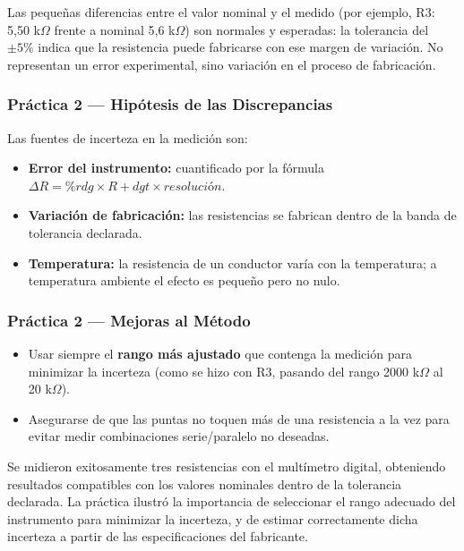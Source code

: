 Las pequeñas diferencias entre el valor nominal y el medido (por ejemplo, R3: 5{,}50 k$\Omega$ frente a nominal 5{,}6 k$\Omega$) son normales y esperadas: la tolerancia del $\pm 5\%$ indica que la resistencia puede fabricarse con ese margen de variación.
No representan un error experimental, sino variación en el proceso de fabricación.

\subsubsection{Práctica 2 --- Hipótesis de las Discrepancias}

Las fuentes de incerteza en la medición son:
\begin{itemize}
    \item \textbf{Error del instrumento:} cuantificado por la fórmula $\Delta R = \%rdg \times R + dgt \times resolución$.
    \item \textbf{Variación de fabricación:} las resistencias se fabrican dentro de la banda de tolerancia declarada.
    \item \textbf{Temperatura:} la resistencia de un conductor varía con la temperatura; a temperatura ambiente el efecto es pequeño pero no nulo.
\end{itemize}

\subsubsection{Práctica 2 --- Mejoras al Método}

\begin{itemize}
    \item Usar siempre el \textbf{rango más ajustado} que contenga la medición para minimizar la incerteza (como se hizo con R3, pasando del rango 2000 k$\Omega$ al 20 k$\Omega$).
    \item Asegurarse de que las puntas no toquen más de una resistencia a la vez para evitar medir combinaciones serie/paralelo no deseadas.
\end{itemize}

Se midieron exitosamente tres resistencias con el multímetro digital, obteniendo resultados compatibles con los valores nominales dentro de la tolerancia declarada.
La práctica ilustró la importancia de seleccionar el rango adecuado del instrumento para minimizar la incerteza, y de estimar correctamente dicha incerteza a partir de las especificaciones del fabricante.


